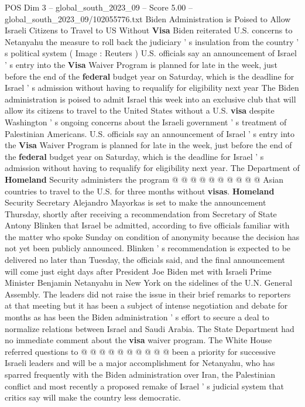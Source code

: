 \begin{textsample}{POS Dim 3 – global\_south\_2023\_09 – Score 5.00 – global\_south\_2023\_09/102055776.txt}  \label{ex:f3_pos_152}
Biden Administration is Poised to Allow Israeli Citizens to Travel to US Without \textbf{Visa} Biden reiterated U.S. concerns to Netanyahu the measure to roll back the judiciary ' s insulation from the country ' s political system ( Image : Reuters ) U.S. officials say an announcement of Israel ' s entry into the \textbf{Visa} Waiver Program is planned for late in the week, just before the end of the \textbf{federal} budget year on Saturday, which is the deadline for Israel ' s admission without having to requalify for eligibility next year The Biden administration is poised to admit Israel this week into an exclusive club that will allow its citizens to travel to the United States without a U.S. \textbf{visa} despite Washington ' s ongoing concerns about the Israeli government ' s treatment of Palestinian Americans.
U.S. officials say an announcement of Israel ' s entry into the \textbf{Visa} Waiver Program is planned for late in the week, just before the end of the \textbf{federal} budget year on Saturday, which is the deadline for Israel ' s admission without having to requalify for eligibility next year.
The Department of \textbf{Homeland} Security administers the program @ @ @ @ @ @ @ @ @ @ Asian countries to travel to the U.S. for three months without \textbf{visas}. \textbf{Homeland} Security Secretary Alejandro Mayorkas is set to make the announcement Thursday, shortly after receiving a recommendation from Secretary of State Antony Blinken that Israel be admitted, according to five officials familiar with the matter who spoke Sunday on condition of anonymity because the decision has not yet been publicly announced.
Blinken ' s recommendation is expected to be delivered no later than Tuesday, the officials said, and the final announcement will come just eight days after President Joe Biden met with Israeli Prime Minister Benjamin Netanyahu in New York on the sidelines of the U.N.
General Assembly.
The leaders did not raise the issue in their brief remarks to reporters at that meeting but it has been a subject of intense negotiation and debate for months as has been the Biden administration ' s effort to secure a deal to normalize relations between Israel and Saudi Arabia.
The State Department had no immediate comment about the \textbf{visa} waiver program.
The White House referred questions to @ @ @ @ @ @ @ @ @ @ been a priority for successive Israeli leaders and will be a major accomplishment for Netanyahu, who has sparred frequently with the Biden administration over Iran, the Palestinian conflict and most recently a proposed remake of Israel ' s judicial system that critics say will make the country less democratic.

\end{textsample}
